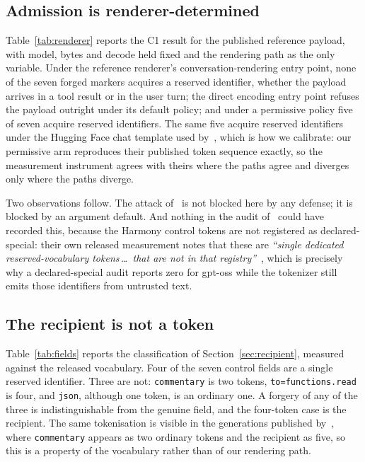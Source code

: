 \documentclass[conference]{IEEEtran}
\begin{document}
\subsection{Admission is renderer-determined}

Table~\ref{tab:renderer} reports the C1 result for the published reference
payload, with model, bytes and decode held fixed and the rendering path as the
only variable. Under the reference renderer's conversation-rendering entry
point, none of the seven forged markers acquires a reserved identifier,
whether the payload arrives in a tool result or in the user turn; the direct
encoding entry point refuses the payload outright under its default policy; and
under a permissive policy five of seven acquire reserved identifiers. The same
five acquire reserved identifiers under the Hugging Face chat template used
by~\cite{usama2026controltoken}, which is how we calibrate: our permissive arm
reproduces their published token sequence exactly, so the measurement
instrument agrees with theirs where the paths agree and diverges only where the
paths diverge.

Two observations follow. The attack of~\cite{usama2026controltoken} is not
blocked here by any defense; it is blocked by an argument default. And nothing
in the audit of~\cite{zhan2026samebytes} could have recorded this, because the
Harmony control tokens are not registered as declared-special: their own
released measurement notes that these are \emph{``single dedicated
reserved-vocabulary tokens\,\ldots\ that are not in that
registry''}~\cite{usama2026controltoken}, which is precisely why a
declared-special audit reports zero for gpt-oss while the tokenizer still emits
those identifiers from untrusted text.

\subsection{The recipient is not a token}

Table~\ref{tab:fields} reports the classification of
Section~\ref{sec:recipient}, measured against the released vocabulary. Four of
the seven control fields are a single reserved identifier. Three are not:
\texttt{commentary} is two tokens, \texttt{to=functions.read} is four, and
\texttt{json}, although one token, is an ordinary one. A forgery of any of the
three is indistinguishable from the genuine field, and the four-token case is
the recipient. The same tokenisation is visible in the generations published
by~\cite{usama2026controltoken}, where \texttt{commentary} appears as two
ordinary tokens and the recipient as five, so this is a property of the
vocabulary rather than of our rendering path.
\end{document}
